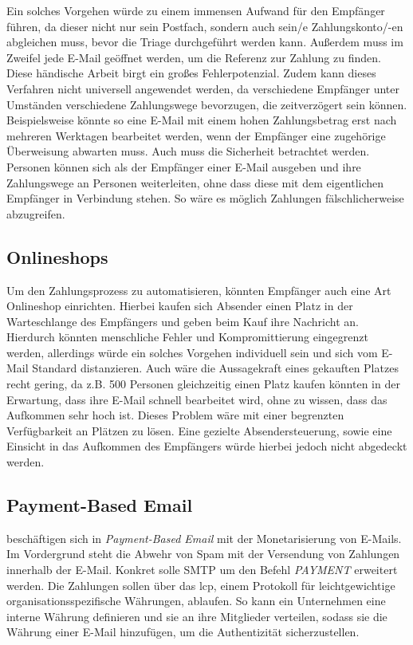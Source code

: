 Ein solches Vorgehen würde zu einem immensen Aufwand für den Empfänger führen, da dieser nicht nur sein Postfach, sondern auch sein/e Zahlungskonto/-en abgleichen muss, bevor die Triage durchgeführt werden kann. Außerdem muss im Zweifel jede E-Mail geöffnet werden, um die Referenz zur Zahlung zu finden. Diese händische Arbeit birgt ein großes Fehlerpotenzial. Zudem kann dieses Verfahren nicht universell angewendet werden, da verschiedene Empfänger unter Umständen verschiedene Zahlungswege bevorzugen, die zeitverzögert sein können. Beispielsweise könnte so eine E-Mail mit einem hohen Zahlungsbetrag erst nach mehreren Werktagen bearbeitet werden, wenn der Empfänger eine zugehörige Überweisung abwarten muss. Auch muss die Sicherheit betrachtet werden. Personen können sich als der Empfänger einer E-Mail ausgeben und ihre Zahlungswege an Personen weiterleiten, ohne dass diese mit dem eigentlichen Empfänger in Verbindung stehen. So wäre es möglich Zahlungen fälschlicherweise abzugreifen.

\subsection{Onlineshops}
Um den Zahlungsprozess zu automatisieren, könnten Empfänger auch eine Art Onlineshop einrichten. Hierbei kaufen sich Absender einen Platz in der Warteschlange des Empfängers und geben beim Kauf ihre Nachricht an. Hierdurch könnten menschliche Fehler und Kompromittierung eingegrenzt werden, allerdings würde ein solches Vorgehen individuell sein und sich vom E-Mail Standard distanzieren. Auch wäre die Aussagekraft eines gekauften Platzes recht gering, da z.B. 500 Personen gleichzeitig einen Platz kaufen könnten in der Erwartung, dass ihre E-Mail schnell bearbeitet wird, ohne zu wissen, dass das Aufkommen sehr hoch ist. Dieses Problem wäre mit einer begrenzten Verfügbarkeit an Plätzen zu lösen. Eine gezielte Absendersteuerung, sowie eine Einsicht in das Aufkommen des Empfängers würde hierbei jedoch nicht abgedeckt werden.

\subsection{Payment-Based Email}
\label{Payment-Based_Email}
\cite{Turner2003} beschäftigen sich in \textit{Payment-Based Email} mit der Monetarisierung von E-Mails. Im Vordergrund steht die Abwehr von Spam mit der Versendung von Zahlungen innerhalb der E-Mail. Konkret solle SMTP um den Befehl \textit{PAYMENT} erweitert werden. Die Zahlungen sollen über das \acrfull{lcp}, einem Protokoll für leichtgewichtige organisationsspezifische Währungen, ablaufen. So kann ein Unternehmen eine interne Währung definieren und sie an ihre Mitglieder verteilen, sodass sie die Währung einer E-Mail hinzufügen, um die Authentizität sicherzustellen.

